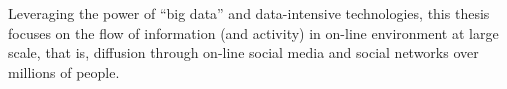 \documentclass[phd,tocprelim]{cornell}
\begin{document}







Leveraging the power of ``big data'' and data-intensive technologies, this thesis focuses on the flow of information (and activity) in on-line environment at large scale, that is, diffusion through on-line social media and social networks over millions of people. 
\end{document}
